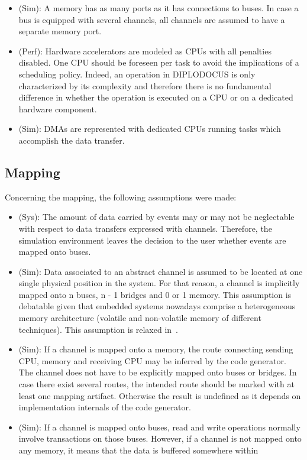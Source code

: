 \documentclass{llncs}
\begin{document}
\begin{subappendices}
\begin{itemize}
	\item (Sim): A memory has as many ports as it has connections to buses. In case a bus is equipped with several
	channels, all channels are assumed to have a separate memory port.
	\item (Perf): Hardware accelerators are modeled as CPUs with all penalties disabled. One CPU should be foreseen
	per task to avoid the implications of a scheduling policy. Indeed, an operation in DIPLODOCUS is only
	characterized by its complexity and therefore there is no fundamental difference in whether the operation is
	executed on a CPU or on a dedicated hardware component.
	\item (Sim): DMAs are represented with dedicated CPUs running tasks which accomplish the data transfer.
\end{itemize}
%
\subsection{Mapping}
%
Concerning the mapping, the following assumptions were made:
\begin{itemize}
	\item (Sys): The amount of data carried by events may or may not be neglectable with respect to data transfers
	expressed with channels. Therefore, the simulation environment leaves the decision to the user whether events
	are mapped onto buses.
	\item (Sim): Data associated to an abstract channel is assumed to be located at one single physical position in
	the system. For that reason, a channel is implicitly mapped onto n buses, n - 1 bridges and 0 or 1 memory. This
	assumption is debatable given that embedded systems nowadays comprise a heterogeneous memory architecture
	(volatile and non-volatile memory of different techniques). This assumption is relaxed in~\cite{Jaber2011}.
	\item (Sim): If a channel is mapped onto a memory, the route connecting sending CPU, memory and receiving CPU
	may be inferred by the code generator. The channel does not have to be explicitly mapped onto buses or bridges.
	In case there exist several routes, the intended route should be marked with at least one mapping artifact.
	Otherwise the result is undefined as it depends on implementation internals of the code generator.
	\item (Sim): If a channel is mapped onto buses, read and write operations normally involve transactions on those
	buses. However, if a channel is not mapped onto any memory, it means that the data is buffered somewhere within

\end{itemize}
\end{subappendices}
\end{document}
